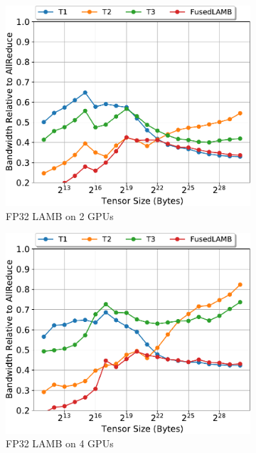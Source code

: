 \begin{figure}
  \small
  \begin{subfigure}{0.66\columnwidth}
    \includegraphics[width=\columnwidth]{figures/results-lamb-2-gpus.pdf}  
    \caption{FP32 LAMB on 2 GPUs}
  \end{subfigure}
  \begin{subfigure}{0.66\columnwidth}
    \includegraphics[width=\columnwidth]{figures/results-lamb-4-gpus.pdf}  
    \caption{FP32 LAMB on 4 GPUs}
  \end{subfigure}
  \begin{subfigure}{0.66\columnwidth}

\end{subfigure}
\end{figure}
